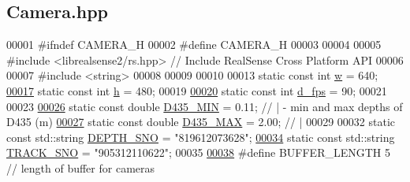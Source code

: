 \hypertarget{Camera_8hpp_source}{}\subsection{Camera.\+hpp}
\label{Camera_8hpp_source}

\begin{DoxyCode}
00001 \textcolor{preprocessor}{#ifndef CAMERA\_H}
00002 \textcolor{preprocessor}{#define CAMERA\_H}
00003 
00004 
00005 \textcolor{preprocessor}{#include <librealsense2/rs.hpp>}     \textcolor{comment}{// Include RealSense Cross Platform API}
00006 
00007 \textcolor{preprocessor}{#include <string>}
00008 
00009 
00010 
00013 \textcolor{keyword}{static} \textcolor{keyword}{const} \textcolor{keywordtype}{int} \hyperlink{Camera_8hpp_a66326676d44c838441a4dc39c85f599b}{w} = 640;
\hypertarget{Camera_8hpp_source.tex_l00017}{}\hyperlink{Camera_8hpp_a3f40fea9b1040e381f08ddd4b026765d}{00017} \textcolor{keyword}{static} \textcolor{keyword}{const} \textcolor{keywordtype}{int} \hyperlink{Camera_8hpp_a3f40fea9b1040e381f08ddd4b026765d}{h} = 480;
00019 
\hypertarget{Camera_8hpp_source.tex_l00020}{}\hyperlink{Camera_8hpp_ad56e71b7cc91ce32f920769b6eb31e03}{00020} \textcolor{keyword}{static} \textcolor{keyword}{const} \textcolor{keywordtype}{int} \hyperlink{Camera_8hpp_ad56e71b7cc91ce32f920769b6eb31e03}{d\_fps} = 90; 
00021 
00023 
\hypertarget{Camera_8hpp_source.tex_l00026}{}\hyperlink{Camera_8hpp_a8c14b0a57a757fa1eca7b19c2d0bd110}{00026} \textcolor{keyword}{static} \textcolor{keyword}{const} \textcolor{keywordtype}{double} \hyperlink{Camera_8hpp_a8c14b0a57a757fa1eca7b19c2d0bd110}{D435\_MIN} = 0.11; \textcolor{comment}{// | - min and max depths of D435 (m)}
\hypertarget{Camera_8hpp_source.tex_l00027}{}\hyperlink{Camera_8hpp_a525f4d6ba7971b5fc8f0bc55ea826762}{00027} \textcolor{keyword}{static} \textcolor{keyword}{const} \textcolor{keywordtype}{double} \hyperlink{Camera_8hpp_a525f4d6ba7971b5fc8f0bc55ea826762}{D435\_MAX} = 2.00; \textcolor{comment}{// |}
00029 \textcolor{comment}{}
00032 \textcolor{keyword}{static} \textcolor{keyword}{const} std::string \hyperlink{Camera_8hpp_a08da237113fcf4a0fb79c89a2ba02bce}{DEPTH\_SNO} = \textcolor{stringliteral}{"819612073628"}; 
\hypertarget{Camera_8hpp_source.tex_l00034}{}\hyperlink{Camera_8hpp_a97168636c8d72f641dc410554a42b2ec}{00034} \textcolor{keyword}{static} \textcolor{keyword}{const} std::string \hyperlink{Camera_8hpp_a97168636c8d72f641dc410554a42b2ec}{TRACK\_SNO} = \textcolor{stringliteral}{"905312110622"}; 
00035 
\hypertarget{Camera_8hpp_source.tex_l00038}{}\hyperlink{Camera_8hpp_af7b7dc9a200cb1404c280bd500fd1551}{00038} \textcolor{preprocessor}{#define BUFFER\_LENGTH 5 // length of buffer for cameras}

\end{DoxyCode}

